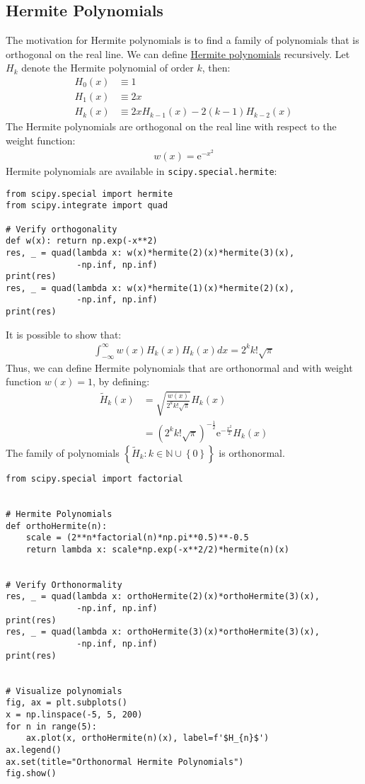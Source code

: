 \documentclass[12pt, a4paper]{article}
\newcommand{\e}[1]{\text{e}^{#1}}
\newcommand{\Set}[1]{\left\{#1\right\}}
\begin{document}
\subsection{Hermite Polynomials}
\label{sec:orgf31a1a4}
The motivation for Hermite polynomials is to find a family of polynomials that is orthogonal on the real line.
We can define \href{https://en.wikipedia.org/wiki/Hermite\_polynomials}{Hermite polynomials} recursively.
Let \(H_k\) denote the Hermite polynomial of order \(k\), then:
\begin{align*}
H_0(x)&\equiv 1\\
H_1(x)&\equiv 2x\\
H_k(x)&\equiv 2xH_{k-1}(x)-2(k-1)H_{k-2}(x)
\end{align*}
The Hermite polynomials are orthogonal on the real line with respect to the weight function:
\begin{align*}
w(x) = \e{-x^2}
\end{align*}
Hermite polynomials are available in \texttt{scipy.special.hermite}:
\lstset{language=jupyter-python,label= ,caption= ,captionpos=b,numbers=none}
\begin{lstlisting}
from scipy.special import hermite
from scipy.integrate import quad

# Verify orthogonality
def w(x): return np.exp(-x**2)
res, _ = quad(lambda x: w(x)*hermite(2)(x)*hermite(3)(x),
              -np.inf, np.inf)
print(res)
res, _ = quad(lambda x: w(x)*hermite(1)(x)*hermite(2)(x),
              -np.inf, np.inf)
print(res)
\end{lstlisting}
It is possible to show that:
\begin{align*}
\int_{-\infty}^{\infty}w(x)H_k(x)H_k(x)dx=2^kk!\sqrt{\pi}
\end{align*}
Thus, we can define Hermite polynomials that are orthonormal and with weight function \(w(x)=1\), by defining:
\begin{align*}
\tilde{H}_k(x)&=\sqrt{\frac{w(x)}{2^kk!\sqrt{\pi}}}H_k(x)\\
&=(2^kk!\sqrt{\pi})^{-\frac{1}{2}}\e{-\frac{x^2}{2}}H_k(x)
\end{align*}
The family of polynomials \(\Set{\tilde{H}_k:k\in\mathbb{N}\cup\Set{0}}\) is orthonormal.
\lstset{language=jupyter-python,label= ,caption= ,captionpos=b,numbers=none}
\begin{lstlisting}
from scipy.special import factorial


# Hermite Polynomials
def orthoHermite(n):
    scale = (2**n*factorial(n)*np.pi**0.5)**-0.5
    return lambda x: scale*np.exp(-x**2/2)*hermite(n)(x)


# Verify Orthonormality
res, _ = quad(lambda x: orthoHermite(2)(x)*orthoHermite(3)(x),
              -np.inf, np.inf)
print(res)
res, _ = quad(lambda x: orthoHermite(3)(x)*orthoHermite(3)(x),
              -np.inf, np.inf)
print(res)


# Visualize polynomials
fig, ax = plt.subplots()
x = np.linspace(-5, 5, 200)
for n in range(5):
    ax.plot(x, orthoHermite(n)(x), label=f'$H_{n}$')
ax.legend()
ax.set(title="Orthonormal Hermite Polynomials")
fig.show()
\end{lstlisting}
\end{document}

